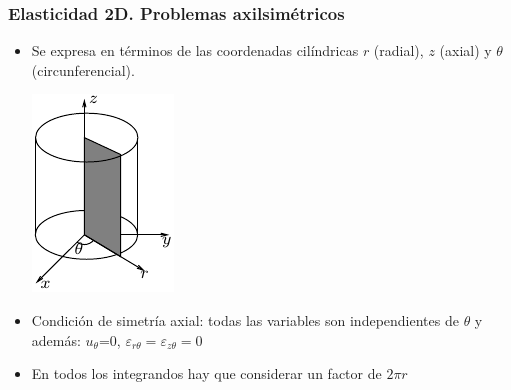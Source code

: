 \documentclass[handout]{beamer}
\begin{document}
\begin{frame}
\frametitle{Elasticidad 2D. Problemas axilsimétricos}
\begin{itemize}
\item Se expresa en términos de las coordenadas cilíndricas $r$ (radial),
$z$ (axial) y $\theta$ (circunferencial).

\includegraphics{axisim1}

\item Condición de simetría axial: todas las variables son independientes de 
$\theta$ y
además: $u_{\theta}$=0, $\varepsilon_{r \theta}=\varepsilon_{z \theta}=0$
\item En todos los integrandos hay que considerar un factor de $2 \pi r$
\end{itemize}
\end{frame}
\end{document}
